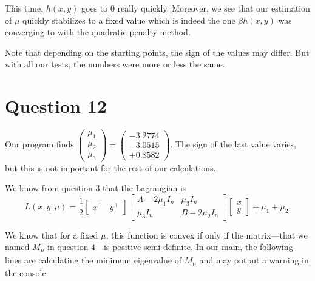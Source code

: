 \documentclass{article}
\newcommand{\tp}{^\top}
\begin{document}
This time, $h(x, y)$ goes to 0 really quickly. Moreover, we see that our estimation of $\mu$ quickly stabilizes to a fixed value which is indeed the one $\beta h(x, y)$ was converging to with the quadratic penalty method.

Note that depending on the starting points, the sign of the values may differ. But with all our tests, the numbers were more or less the same.


\section*{Question 12}

Our program finds  
$\begin{pmatrix}
\mu_1\\
\mu_2\\
\mu_3
\end{pmatrix} =
\begin{pmatrix}
-3.2774\\
-3.0515\\
\pm 0.8582
\end{pmatrix}$. The sign of the last value varies, but this is not important for the rest of our calculations.

We know from question 3 that the Lagrangian is\\
$$ L(x, y, \mu) = \dfrac{1}{2}
\begin{bmatrix} x\tp & y\tp\end{bmatrix}
\begin{bmatrix} A-2\mu_1 I_n & \mu_3 I_n \\
\mu_3 I_n & B-2\mu_2 I_n \end{bmatrix}
\begin{bmatrix} x \\ y \end{bmatrix}
+ \mu_1 + \mu_2. $$

We know that for a fixed $\mu$, this function is convex if only if the matrix---that we named $M_\mu$ in question 4---is positive semi-definite.
In our main, the following lines are calculating the minimum eigenvalue of $M_\mu$ and may output a warning in the console.


\end{document}

